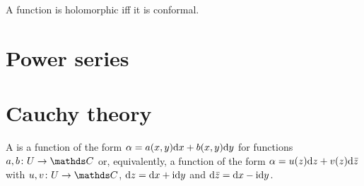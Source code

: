 \begin{prop}
	A function is holomorphic iff it is conformal.
\end{prop}

\section{Power series}


\section{Cauchy theory}

A  is a function of the form
\(\alpha = a(x, y)\mathrm{d} x + b(x, y) \mathrm{d} y\)
for functions \(a, b\colon U \to \C\)
or, equivalently, a function of the form
\(\alpha = u(z)\mathrm{d} z + v(z)\mathrm{d}\bar z\)
with \(u, v\colon U \to \C\),
\(\mathrm{d} z = \mathrm{d} x + \mathrm{i}\mathrm{d} y\) and \(\mathrm{d}\bar z = \mathrm{d} x - \mathrm{i}\mathrm{d} y\).
